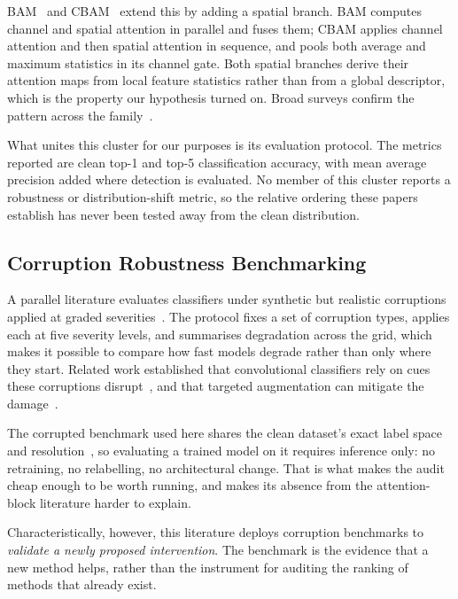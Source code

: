 \documentclass[10pt]{article}
\begin{document}
BAM~\citep{park2018bam} and CBAM~\citep{woo2018cbam} extend this by adding a
spatial branch. BAM computes channel and spatial attention in parallel and fuses
them; CBAM applies channel attention and then spatial attention in sequence, and
pools both average and maximum statistics in its channel gate. Both spatial
branches derive their attention maps from local feature statistics rather than
from a global descriptor, which is the property our hypothesis turned on. Broad
surveys confirm the pattern across the family~\citep{guo2022attention}.

What unites this cluster for our purposes is its evaluation protocol. The
metrics reported are clean top-1 and top-5 classification accuracy, with mean
average precision added where detection is evaluated. No member of this cluster
reports a robustness or distribution-shift metric, so the relative ordering
these papers establish has never been tested away from the clean distribution.

\subsection{Corruption Robustness Benchmarking}

A parallel literature evaluates classifiers under synthetic but realistic
corruptions applied at graded severities~\citep{hendrycks2019benchmarking}. The
protocol fixes a set of corruption types, applies each at five severity levels,
and summarises degradation across the grid, which makes it possible to compare
how fast models degrade rather than only where they start. Related work
established that convolutional classifiers rely on cues these corruptions
disrupt~\citep{geirhos2019imagenet}, and that targeted augmentation can mitigate
the damage~\citep{hendrycks2020augmix}.

The corrupted benchmark used here shares the clean dataset's exact label space
and resolution~\citep{krizhevsky2009learning}, so evaluating a trained model on
it requires inference only: no retraining, no relabelling, no architectural
change. That is what makes the audit cheap enough to be worth running, and makes
its absence from the attention-block literature harder to explain.

Characteristically, however, this literature deploys corruption benchmarks to
\emph{validate a newly proposed intervention}. The benchmark is the evidence
that a new method helps, rather than the instrument for auditing the ranking of
methods that already exist.
\end{document}
